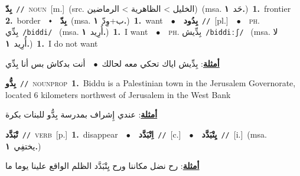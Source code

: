 \documentclass[10pt,a4paper,twoside]{article} %
\begin{document}
\begin{multicols}{2}
{\setlength\topsep{0pt}\textbf{\foreignlanguage{arabic}{بِدّ}}\ {\color{gray}\texttt{//}\color{black}}\ \textsc{noun}\ [m.]\ (src. \color{gray}\foreignlanguage{arabic}{الخليل > الظاهرية > الرماضين}\color{black})\ \color{gray}(msa. \foreignlanguage{arabic}{حَد}~\foreignlanguage{arabic}{\textbf{١.}})\color{black}\ \textbf{1.}~frontier  \textbf{2.}~border\ \ $\smblkdiamond$\ \ \setlength\topsep{0pt}\textbf{\foreignlanguage{arabic}{بِدّ}}\ \color{gray}(msa. \foreignlanguage{arabic}{ب+وِدّ}~\foreignlanguage{arabic}{\textbf{١.}})\color{black}\ \textbf{1.}~want\ \ $\bullet$\ \ \setlength\topsep{0pt}\textbf{\foreignlanguage{arabic}{بِدُود}}\ {\color{gray}\texttt{//}\color{black}}\ [pl.]\ \ $\bullet$\ \ \textsc{ph.} \color{gray} \foreignlanguage{arabic}{بِدِّي}\color{black}\ {\color{gray}\texttt{/{\sffamily biddi}/}\color{black}}\ \color{gray} (msa. \foreignlanguage{arabic}{أُرِيد}~\foreignlanguage{arabic}{\textbf{١.}})\color{black}\ \textbf{1.}~I want\ \ $\bullet$\ \ \textsc{ph.} \color{gray} \foreignlanguage{arabic}{بِدِّيش}\color{black}\ {\color{gray}\texttt{/{\sffamily biddiːʃ}/}\color{black}}\ \color{gray} (msa. \foreignlanguage{arabic}{لا أُرِيد}~\foreignlanguage{arabic}{\textbf{١.}})\color{black}\ \textbf{1.}~I do not want\  \begin{flushright}\color{gray}\foreignlanguage{arabic}{\textbf{\underline{\foreignlanguage{arabic}{أمثلة}}}: بِدِّيش اياك تحكي معه لحالك\ $\bullet$\ \  أنت بدكاش بس أنا بِدِّي}\end{flushright}\color{black}} \vspace{2mm}

{\setlength\topsep{0pt}\textbf{\foreignlanguage{arabic}{بِدُّو}}\ {\color{gray}\texttt{//}\color{black}}\ \textsc{noun\textunderscore prop}\ \textbf{1.}~Biddu is a Palestinian town in the Jerusalem Governorate, located 6 kilometers northwest of Jerusalem in the West Bank\  \begin{flushright}\color{gray}\foreignlanguage{arabic}{\textbf{\underline{\foreignlanguage{arabic}{أمثلة}}}: عندي إِشراف بمدرسة بِدُّو للبنات بكرة}\end{flushright}\color{black}} \vspace{2mm}

{\setlength\topsep{0pt}\textbf{\foreignlanguage{arabic}{تْبَدَّد}}\ {\color{gray}\texttt{//}\color{black}}\ \textsc{verb}\ [p.]\ \textbf{1.}~disappear\ \ $\bullet$\ \ \setlength\topsep{0pt}\textbf{\foreignlanguage{arabic}{اِتْبَدَّد}}\ {\color{gray}\texttt{//}\color{black}}\ [c.]\ \ $\bullet$\ \ \setlength\topsep{0pt}\textbf{\foreignlanguage{arabic}{يِتْبَدَّد}}\ {\color{gray}\texttt{//}\color{black}}\ [i.]\ \color{gray}(msa. \foreignlanguage{arabic}{يختفِي}~\foreignlanguage{arabic}{\textbf{١.}})\color{black}\  \begin{flushright}\color{gray}\foreignlanguage{arabic}{\textbf{\underline{\foreignlanguage{arabic}{أمثلة}}}: رح نضل مكاننا ورح يِتْبَدَّد الظلم الواقع علينا يوما ما}\end{flushright}\color{black}} \vspace{2mm}


\end{multicols}
\end{document}
